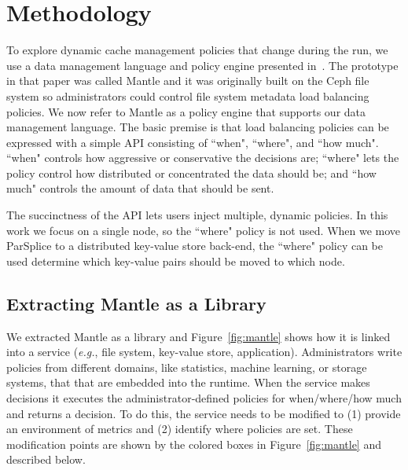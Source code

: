 \section{Methodology}

To explore dynamic cache management policies that change during the run, we use
a data management language and policy engine presented
in~\cite{sevilla:sc15-mantle}. The prototype in that paper was called Mantle
and it was originally built on the Ceph file system so administrators could
control file system metadata load balancing policies. We now refer to Mantle as
a policy engine that supports our data management language.  The basic premise
is that load balancing policies can be expressed with a simple API consisting
of ``when", ``where", and ``how much". ``when" controls how aggressive or
conservative the decisions are; ``where" lets the policy control how
distributed or concentrated the data should be; and ``how much" controls the
amount of data that should be sent.

The succinctness of the API lets users inject multiple, dynamic policies. In
this work we focus on a single node, so the ``where" policy is not used. When
we move ParSplice to a distributed key-value store back-end, the ``where" policy
can be used determine which key-value pairs should be moved to which node.

\subsection{Extracting Mantle as a Library}


We extracted Mantle as a library and Figure~\ref{fig:mantle} shows how it is
linked into a service ({\it e.g.}, file system, key-value store, application).
Administrators write policies from different domains, like statistics, machine
learning, or storage systems, that that are embedded into the runtime. When the
service makes decisions it executes the administrator-defined policies for
when/where/how much and returns a decision. To do this, the service needs to be
modified to (1) provide an environment of metrics and (2) identify where
policies are set. These modification points are shown by the colored boxes in
Figure~\ref{fig:mantle} and described below.

